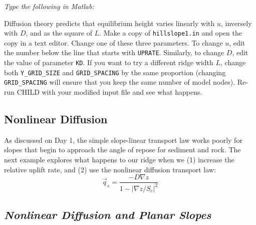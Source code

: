\documentclass[12pt]{amsart}
\begin{document}
\medskip
{\em
Type the following in Matlab:
Diffusion theory predicts that equilibrium height varies linearly with $u$, inversely with $D$, and as the square of $L$. Make a copy of {\tt hillslope1.in} and open the copy in a text editor. Change one of these three parameters. To change $u$, edit the number below the line that starts with {\tt UPRATE}. Similarly, to change $D$, edit the value of parameter {\tt KD}. If you want to try a different ridge width $L$, change both {\tt Y\_GRID\_SIZE} and {\tt GRID\_SPACING} by the same proportion (changing {\tt GRID\_SPACING} will ensure that you keep the same number of model nodes). Re-run CHILD with your modified input file and see what happens.
}

\subsection{Nonlinear Diffusion}

As discussed on Day 1, the simple slope-linear transport law works poorly for slopes that begin to approach the angle of repose for sediment and rock. The next example explores what happens to our ridge when we (1) increase the relative uplift rate, and (2) use the nonlinear diffusion transport law:
\begin{equation}
\vec{q}_s = \frac{-D \nabla z}{1-|\nabla z/S_c|^2}
\end{equation}

\subsection*{\em Nonlinear Diffusion and Planar Slopes}
\end{document}
